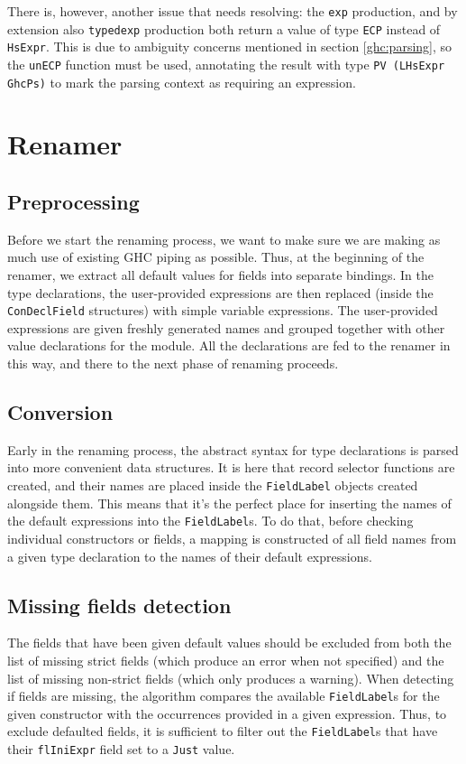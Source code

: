 \documentclass[en]{pracamgr}
\newcommand{\code}[1]{\lstinline[breaklines=true]{#1}}
\begin{document}
There is, however, another issue that needs resolving: the \code{exp} production, and by extension also \code{typedexp} 
production both return a value of type \code{ECP} instead of \code{HsExpr}. This is due to ambiguity concerns 
mentioned in section \ref*{ghc:parsing}, so the \code{unECP} function must be used, 
annotating the result with type \code{PV (LHsExpr GhcPs)} to mark the parsing context as requiring an expression.

\section{Renamer}\label{impl:renamer}
\subsection{Preprocessing}
Before we start the renaming process, we want to make sure we are making as much use of existing GHC piping as possible.
Thus, at the beginning of the renamer, we extract all default values for fields into separate bindings.
In the type declarations, the user-provided expressions are then replaced (inside the \code{ConDeclField} structures) with simple variable expressions.
The user-provided expressions are given freshly generated names and grouped together with other value declarations for the module.
All the declarations are fed to the renamer in this way, and there to the next phase of renaming proceeds.
\subsection{Conversion}
Early in the renaming process, the abstract syntax for type declarations is parsed into more convenient data structures.
It is here that record selector functions are created, and their names are placed inside the \code{FieldLabel} objects created alongside them.
This means that it's the perfect place for inserting the names of the default expressions into the \code{FieldLabel}s.
To do that, before checking individual constructors or fields, a mapping is constructed of all field names from a given type declaration to the names of their default expressions.
\subsection{Missing fields detection}
The fields that have been given default values should be excluded from both the list of missing strict fields 
(which produce an error when not specified) and the list of missing non-strict fields (which only produces a warning).
When detecting if fields are missing, the algorithm compares the available \code{FieldLabel}s for the given constructor with the occurrences provided in a given expression.
Thus, to exclude defaulted fields, it is sufficient to filter out the \code{FieldLabel}s that have their \code{flIniExpr} field set to a \code{Just} value.
\end{document}
